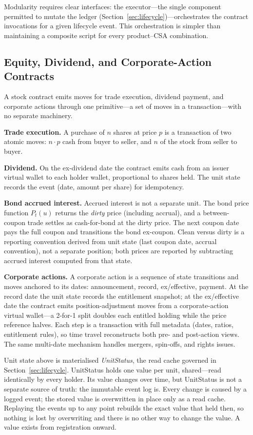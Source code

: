 Modularity requires clear interfaces: the executor---the single component permitted to mutate the ledger (Section~\ref{sec:lifecycle})---orchestrates the contract invocations for a given lifecycle event. This orchestration is simpler than maintaining a composite script for every product--CSA combination.

\subsection{Equity, Dividend, and Corporate-Action Contracts}

A stock contract emits moves for trade execution, dividend payment, and corporate actions through one primitive---a set of moves in a transaction---with no separate machinery.

\noindent\textbf{Trade execution.} A purchase of $n$ shares at price $p$ is a transaction of two atomic moves: $n \cdot p$ cash from buyer to seller, and $n$ of the stock from seller to buyer.

\noindent\textbf{Dividend.} On the ex-dividend date the contract emits cash from an issuer virtual wallet to each holder wallet, proportional to shares held. The unit state records the event (date, amount per share) for idempotency.

\noindent\textbf{Bond accrued interest.} Accrued interest is not a separate unit. The bond price function $P_t(u)$ returns the \emph{dirty} price (including accrual), and a between-coupon trade settles as cash-for-bond at the dirty price. The next coupon date pays the full coupon and transitions the bond ex-coupon. Clean versus dirty is a reporting convention derived from unit state (last coupon date, accrual convention), not a separate position; both prices are reported by subtracting accrued interest computed from that state.

\noindent\textbf{Corporate actions.} A corporate action is a sequence of state transitions and moves anchored to its dates: announcement, record, ex/effective, payment. At the record date the unit state records the entitlement snapshot; at the ex/effective date the contract emits position-adjustment moves from a corporate-action virtual wallet---a 2-for-1 split doubles each entitled holding while the price reference halves. Each step is a transaction with full metadata (dates, ratios, entitlement rules), so time travel reconstructs both pre- and post-action views. The same multi-date mechanism handles mergers, spin-offs, and rights issues.

\begin{remark}
Unit state above is materialised \emph{UnitStatus}, the read cache governed in Section~\ref{sec:lifecycle}. UnitStatus holds one value per unit, shared---read identically by every holder. Its value changes over time, but UnitStatus is not a separate source of truth: the immutable event log is. Every change is caused by a logged event; the stored value is overwritten in place only as a read cache. Replaying the events up to any point rebuilds the exact value that held then, so nothing is lost by overwriting and there is no other way to change the value. A value exists from registration onward.
\end{remark}

